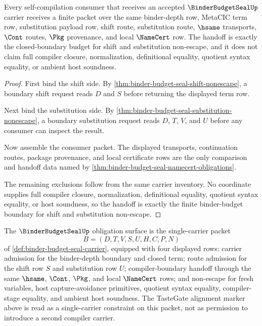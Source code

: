 \begin{theorem}
\label{thm:binder-budget-seal-self-compile-handoff}
Every self-compilation consumer that receives an accepted $\BinderBudgetSealUp$ carrier receives a finite packet over the same binder-depth row, MetaCIC term row, substitution payload row, shift route, substitution route, $\hsame$ transports, $\Cont$ routes, $\Pkg$ provenance, and local $\NameCert$ row. The handoff is exactly the closed-boundary budget for shift and substitution non-escape, and it does not claim full compiler closure, normalization, definitional equality, quotient syntax equality, or ambient host soundness.
\end{theorem}
\begin{proof}
First bind the shift side. By \autoref{thm:binder-budget-seal-shift-nonescape}, a boundary shift request reads $D$ and $S$ before returning the displayed term row.

Next bind the substitution side. By \autoref{thm:binder-budget-seal-substitution-nonescape}, a boundary substitution request reads $D$, $T$, $V$, and $U$ before any consumer can inspect the result.

Now assemble the consumer packet. The displayed transports, continuation routes, package provenance, and local certificate rows are the only comparison and handoff data named by \autoref{thm:binder-budget-seal-namecert-obligations}.

The remaining exclusions follow from the same carrier inventory. No coordinate supplies full compiler closure, normalization, definitional equality, quotient syntax equality, or host soundness, so the handoff is exactly the finite binder-budget boundary for shift and substitution non-escape.
\end{proof}

\begin{definition}
\label{def:binder-budget-seal-obligation-surface}
The $\BinderBudgetSealUp$ obligation surface is the single-carrier packet
$$
B=(D,T,V,S,U,H,C,P,N)
$$
of \autoref{def:binder-budget-seal-carrier}, equipped with four displayed rows: carrier admission for the binder-depth boundary and closed term; route admission for the shift row $S$ and substitution row $U$; compiler-boundary handoff through the same $\hsame$, $\Cont$, $\Pkg$, and local $\NameCert$ rows; and non-escape for fresh variables, host capture-avoidance primitives, quotient syntax equality, compiler-stage equality, and ambient host soundness. The TasteGate alignment marker above is read as a single-carrier constraint on this packet, not as permission to introduce a second compiler carrier.
\end{definition}


